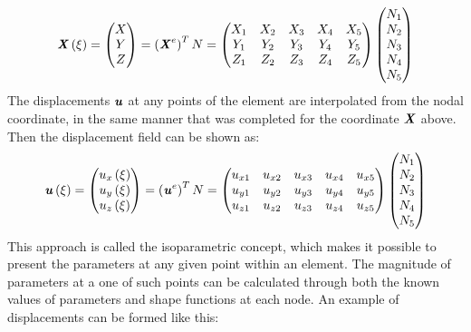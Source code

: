 \begin{equation}
\textbf{\textit{X}}  \left(\xi\right) = \begin{pmatrix}
X \\
Y \\
Z
\end{pmatrix} = \left(\textbf{\textit{X}}^e\right)^T N = \begin{pmatrix}
X_1 & X_2 & X_3 & X_4 & X_5 \\
Y_1 & Y_2 & Y_3 & Y_4 & Y_5 \\
Z_1 & Z_2 & Z_3 & Z_4 & Z_5
\end{pmatrix} \begin{pmatrix}
N_1 \\
N_2 \\
N_3 \\
N_4 \\
N_5 
\end{pmatrix}
\end{equation} 
The displacements $\textbf{\textit{u}}$ at any points of the element are interpolated from the nodal coordinate, in the same manner that was completed for the coordinate  $\textbf{\textit{X}}$ above. Then the displacement field can be shown as:
\begin{equation}
\textbf{\textit{u}}\left(\xi\right) = \begin{pmatrix}
u_x\left(\xi\right) \\
u_y\left(\xi\right) \\
u_z\left(\xi\right) 
\end{pmatrix} = \left(\textbf{\textit{u}}^e\right)^T N = \begin{pmatrix}
u_{x1} & u_{x2} & u_{x3} & u_{x4} & u_{x5} \\
u_{y1} & u_{y2} & u_{y3} & u_{y4} & u_{y5} \\
u_{z1} & u_{z2} & u_{z3} & u_{z4} & u_{z5}
\end{pmatrix} \begin{pmatrix}
N_1 \\
N_2 \\
N_3 \\
N_4 \\
N_5 
\end{pmatrix}
\end{equation}
This approach is called the isoparametric concept, which makes it possible to present  the parameters at any given point within an element. The magnitude of parameters at a one of such points can be calculated through both the known values of parameters and shape functions at each node. An example of displacements can be formed like this:
